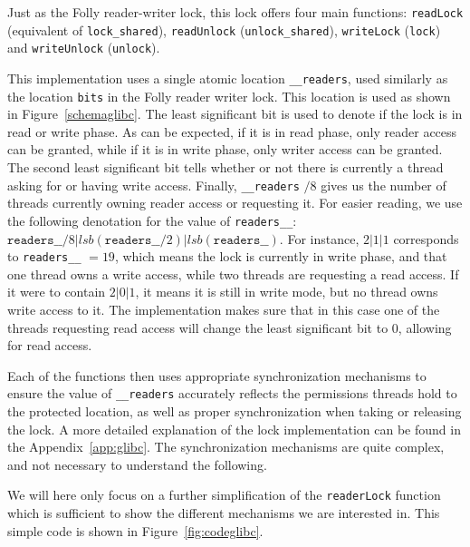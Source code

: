Just as the Folly reader-writer lock, this lock offers four main functions: \texttt{readLock} (equivalent of \texttt{lock\_shared}), \texttt{readUnlock} (\texttt{unlock\_shared}), \texttt{writeLock} (\texttt{lock}) and \texttt{writeUnlock} (\texttt{unlock}).

This implementation uses a single atomic location \texttt{\_\_readers}, used similarly as the location \texttt{bits} in the Folly reader writer lock. This location is used as shown in Figure~\ref{schemaglibc}. The least significant bit is used to denote if the lock is in read or write phase. As can be expected, if it is in read phase, only reader access can be granted, while if it is in write phase, only writer access can be granted. The second least significant bit tells whether or not there is currently a thread asking for or having write access. Finally, \texttt{\_\_readers} $/ 8$ gives us the number of threads currently owning reader access or requesting it. For easier reading, we use the following denotation for the value of \texttt{readers\_\_}: $\mathtt{readers\_\_} / 8 | lsb(\mathtt{readers\_\_ }/ 2) | lsb(\mathtt{readers\_\_})$. For instance, $2|1|1$ corresponds to \texttt{readers\_\_} $=19$, which means the lock is currently in write phase, and that one thread owns a write access, while two threads are requesting a read access. If it were to contain $2 | 0 | 1$, it means it is still in write mode, but no thread owns write access to it. The implementation makes sure that in this case one of the threads requesting read access will change the least significant bit to $0$, allowing for read access.

Each of the functions then uses appropriate synchronization mechanisms to ensure the value of \texttt{\_\_readers} accurately reflects the permissions threads hold to the protected location, as well as proper synchronization when taking or releasing the lock. A more detailed explanation of the lock implementation can be found in the Appendix~\ref{app:glibc}. The synchronization mechanisms are quite complex, and not necessary to understand the following.

We will here only focus on a further simplification of the \texttt{readerLock} function which is sufficient to show the different mechanisms we are interested in. 
This simple code is shown in Figure~\ref{fig:codeglibc}.

